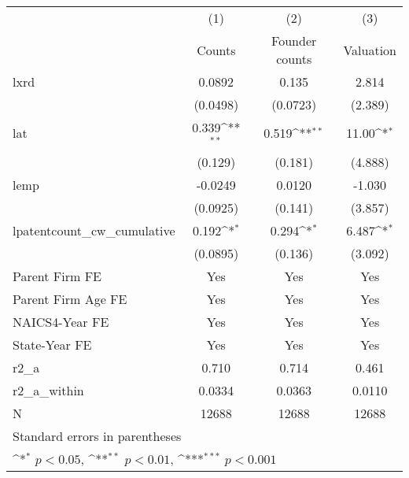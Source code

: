 {
\def\sym#1{\ifmmode^{#1}\else\(^{#1}\)\fi}
\begin{tabular}{l*{3}{c}}
\hline\hline
            &\multicolumn{1}{c}{(1)}&\multicolumn{1}{c}{(2)}&\multicolumn{1}{c}{(3)}\\
            &\multicolumn{1}{c}{Counts}&\multicolumn{1}{c}{Founder counts}&\multicolumn{1}{c}{Valuation}\\
\hline
lxrd        &      0.0892         &       0.135         &       2.814         \\
            &    (0.0498)         &    (0.0723)         &     (2.389)         \\
[1em]
lat         &       0.339\sym{**} &       0.519\sym{**} &       11.00\sym{*}  \\
            &     (0.129)         &     (0.181)         &     (4.888)         \\
[1em]
lemp        &     -0.0249         &      0.0120         &      -1.030         \\
            &    (0.0925)         &     (0.141)         &     (3.857)         \\
[1em]
lpatentcount\_cw\_cumulative&       0.192\sym{*}  &       0.294\sym{*}  &       6.487\sym{*}  \\
            &    (0.0895)         &     (0.136)         &     (3.092)         \\
[1em]
Parent Firm FE&         Yes         &         Yes         &         Yes         \\
[1em]
Parent Firm Age FE&         Yes         &         Yes         &         Yes         \\
[1em]
NAICS4-Year FE&         Yes         &         Yes         &         Yes         \\
[1em]
State-Year FE&         Yes         &         Yes         &         Yes         \\
\hline
r2\_a        &       0.710         &       0.714         &       0.461         \\
r2\_a\_within &      0.0334         &      0.0363         &      0.0110         \\
N           &       12688         &       12688         &       12688         \\
\hline\hline
\multicolumn{4}{l}{\footnotesize Standard errors in parentheses}\\
\multicolumn{4}{l}{\footnotesize \sym{*} \(p<0.05\), \sym{**} \(p<0.01\), \sym{***} \(p<0.001\)}\\
\end{tabular}
}
